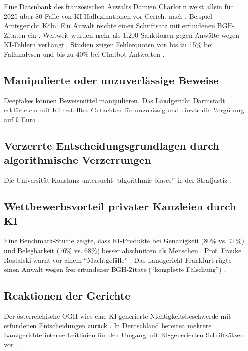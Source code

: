 \documentclass[12pt,a4paper]{article}
\begin{document}
	Eine Datenbank des französischen Anwalts Damien Charlotin weist allein für 2025 über 80 Fälle von KI-Halluzinationen vor Gericht nach \cite{Charlotin2025}. Beispiel Amtsgericht Köln: Ein Anwalt reichte einen Schriftsatz mit erfundenen BGH-Zitaten ein \cite{LTO2025a}. Weltweit wurden mehr als 1.200 Sanktionen gegen Anwälte wegen KI-Fehlern verhängt \cite{NPR2025}. Studien zeigen Fehlerquoten von bis zu 15\% bei Fallanalysen und bis zu 40\% bei Chatbot-Antworten \cite{LTO2025b, heise2025}.
	
	\subsection{Manipulierte oder unzuverlässige Beweise}
	
	Deepfakes können Beweismittel manipulieren. Das Landgericht Darmstadt erklärte ein mit KI erstelltes Gutachten für unzulässig und kürzte die Vergütung auf 0 Euro \cite{LG Darmstadt2025}.
	
	\subsection{Verzerrte Entscheidungsgrundlagen durch algorithmische Verzerrungen}
	
	Die Universität Konstanz untersucht \enquote{algorithmic biases} in der Strafjustiz \cite{Uni Konstanz2025}.
	
	\subsection{Wettbewerbsvorteil privater Kanzleien durch KI}
	
	Eine Benchmark-Studie zeigte, dass KI-Produkte bei Genauigkeit (80\% vs. 71\%) und Belegbarkeit (76\% vs. 68\%) besser abschnitten als Menschen \cite{ValAI2025}. Prof. Frauke Rostalski warnt vor einem \enquote{Machtgefälle} \cite{Rostalski2024}. Das Landgericht Frankfurt rügte einen Anwalt wegen frei erfundener BGH-Zitate (\enquote{komplette Fälschung}) \cite{LG Frankfurt2025}.
	
	\subsection{Reaktionen der Gerichte}
	
	Der österreichische OGH wies eine KI-generierte Nichtigkeitsbeschwerde mit erfundenen Entscheidungen zurück \cite{OGH2025}. In Deutschland bereiten mehrere Landgerichte interne Leitlinien für den Umgang mit KI-generierten Schriftsätzen vor \cite{LegalTech2025}.
	
\end{document}
